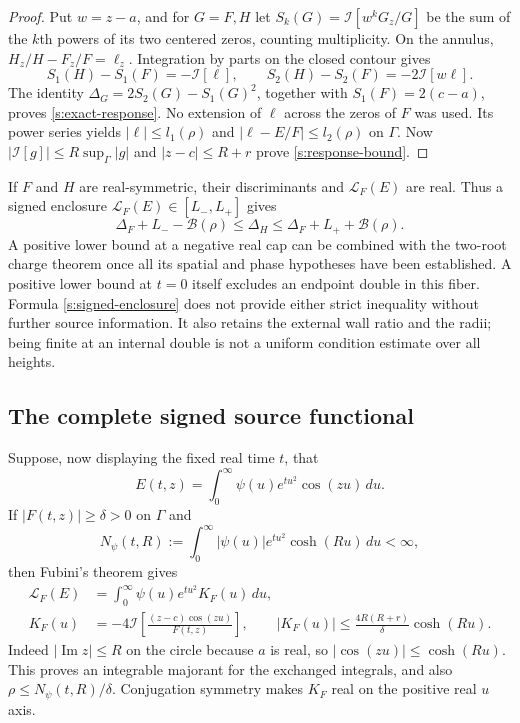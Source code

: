 \begin{proof}
Put $w=z-a$, and for $G=F,H$ let
$S_k(G)=\mathcal I[w^kG_z/G]$ be the sum of the $k$th powers of its
two centered zeros, counting multiplicity.  On the annulus,
$H_z/H-F_z/F=\ell_z$.  Integration by parts on the closed contour gives
\[
 S_1(H)-S_1(F)=-\mathcal I[\ell],\qquad
 S_2(H)-S_2(F)=-2\mathcal I[w\ell].
\]
The identity $\Delta_G=2S_2(G)-S_1(G)^2$, together with
$S_1(F)=2(c-a)$, proves \eqref{s:exact-response}.  No extension of
$\ell$ across the zeros of $F$ was used.  Its power series yields
$|\ell|\le l_1(\rho)$ and $|\ell-E/F|\le l_2(\rho)$ on $\Gamma$.
Now $|\mathcal I[g]|\le R\sup_\Gamma|g|$ and
$|z-c|\le R+r$ prove \eqref{s:response-bound}.
\end{proof}

If $F$ and $H$ are real-symmetric, their discriminants and
$\mathcal L_F(E)$ are real.  Thus a signed enclosure
$\mathcal L_F(E)\in[L_-,L_+]$ gives
\begin{equation}
 \Delta_F+L_- -\mathcal B(\rho)
 \le\Delta_H\le
 \Delta_F+L_+ +\mathcal B(\rho).
 \label{s:signed-enclosure}
\end{equation}
A positive lower bound at a negative real cap can be combined with the
two-root charge theorem once all its spatial and phase hypotheses have
been established.  A positive lower bound at $t=0$ itself excludes an
endpoint double in this fiber.  Formula \eqref{s:signed-enclosure}
does not provide either strict inequality without further source
information.  It also retains the external wall ratio and the radii;
being finite at an internal double is not a uniform condition estimate
over all heights.

\subsection{The complete signed source functional}

Suppose, now displaying the fixed real time $t$, that
\[
 E(t,z)=\int_0^\infty\psi(u)e^{tu^2}\cos(zu)\,du.
\]
If $|F(t,z)|\ge\delta>0$ on $\Gamma$ and
\begin{equation}
 N_\psi(t,R):=\int_0^\infty|\psi(u)|e^{tu^2}\cosh(Ru)\,du<\infty,
 \label{s:complete-residual-norm}
\end{equation}
then Fubini's theorem gives
\begin{align}
 \mathcal L_F(E)&=\int_0^\infty\psi(u)e^{tu^2}K_F(u)\,du,
 \label{s:source-functional}\\
 K_F(u)&=-4\mathcal I\!\left[
             \frac{(z-c)\cos(zu)}{F(t,z)}\right],
 \qquad
 |K_F(u)|\le\frac{4R(R+r)}{\delta}\cosh(Ru).
 \label{s:source-kernel}
\end{align}
Indeed $|\operatorname{Im}z|\le R$ on the circle because $a$ is real,
so $|\cos(zu)|\le\cosh(Ru)$.  This proves an integrable majorant for
the exchanged integrals, and also
$\rho\le N_\psi(t,R)/\delta$.  Conjugation symmetry makes $K_F$ real
on the positive real $u$ axis.

